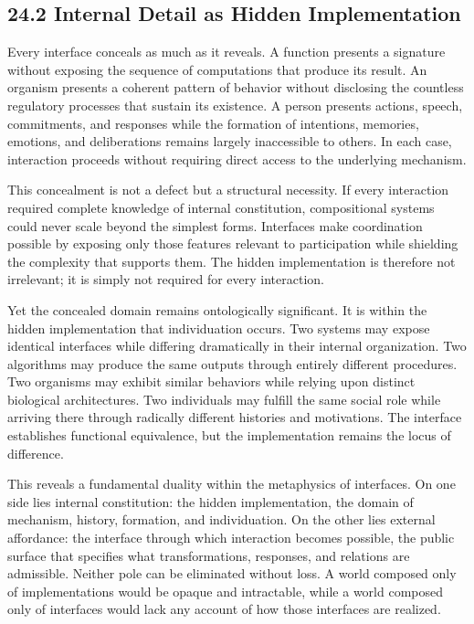 \documentclass[12pt,letterpaper]{article}
\theoremstyle{remark}
\begin{document}
\subsection{24.2 Internal Detail as Hidden Implementation}

Every interface conceals as much as it reveals. A function presents a signature without exposing the sequence of computations that produce its result. An organism presents a coherent pattern of behavior without disclosing the countless regulatory processes that sustain its existence. A person presents actions, speech, commitments, and responses while the formation of intentions, memories, emotions, and deliberations remains largely inaccessible to others. In each case, interaction proceeds without requiring direct access to the underlying mechanism.

This concealment is not a defect but a structural necessity. If every interaction required complete knowledge of internal constitution, compositional systems could never scale beyond the simplest forms. Interfaces make coordination possible by exposing only those features relevant to participation while shielding the complexity that supports them. The hidden implementation is therefore not irrelevant; it is simply not required for every interaction.

Yet the concealed domain remains ontologically significant. It is within the hidden implementation that individuation occurs. Two systems may expose identical interfaces while differing dramatically in their internal organization. Two algorithms may produce the same outputs through entirely different procedures. Two organisms may exhibit similar behaviors while relying upon distinct biological architectures. Two individuals may fulfill the same social role while arriving there through radically different histories and motivations. The interface establishes functional equivalence, but the implementation remains the locus of difference.

This reveals a fundamental duality within the metaphysics of interfaces. On one side lies internal constitution: the hidden implementation, the domain of mechanism, history, formation, and individuation. On the other lies external affordance: the interface through which interaction becomes possible, the public surface that specifies what transformations, responses, and relations are admissible. Neither pole can be eliminated without loss. A world composed only of implementations would be opaque and intractable, while a world composed only of interfaces would lack any account of how those interfaces are realized.
\end{document}
